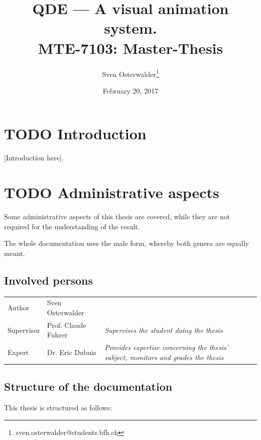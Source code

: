 \documentclass[10pt, openright, notitlepage]{scrreprt}
\author{Sven Osterwalder\thanks{sven.osterwalder@students.bfh.ch}}
\date{February 20, 2017}
\title{QDE --- A visual animation system.\\\medskip
\large MTE-7103: Master-Thesis}
\begin{document}
\maketitle
\tableofcontents



\chapter{{\bfseries\sffamily TODO} Introduction}
\label{sec:orgd1b9bb9}

[Introduction here].

\chapter{{\bfseries\sffamily TODO} Administrative aspects}
\label{sec:org42a5d29}

Some administrative aspects of this thesis are covered, while they are not
required for the understanding of the result.

The whole documentation uses the male form, whereby both genera are equally
meant.

\section{Involved persons}
\label{sec:org198cd83}

\begin{center}
\begin{tabular}{lll}
Author & Sven Osterwalder\footnotemark & \\
Supervisor & Prof. Claude Fuhrer\footnotemark & \emph{Supervises the student doing the thesis}\\
Expert & Dr. Eric Dubuis\footnotemark & \emph{Provides expertise concerning the thesis' subject, monitors and grades the thesis}\\
\end{tabular}
\end{center}

\section{Structure of the documentation}
\label{sec:org2f13a52}

This thesis is structured as follows:
\end{document}
